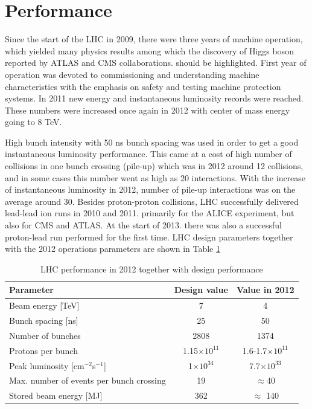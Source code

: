
\section{Performance}

Since the start of the LHC in 2009, there were three years of machine operation, which yielded many physics results among which the discovery of Higgs boson reported by ATLAS and CMS collaborations. should be highlighted. First year of operation was devoted to commissioning and understanding machine characteristics with the emphasis on safety and testing machine protection systems. In 2011 new energy and instantaneous luminosity records were reached. These numbers were increased once again in 2012 with center of mass energy going to 8 TeV.
\par High bunch intensity with 50 ns bunch spacing was used in order to get a good instantaneous luminosity performance. This came at a cost of high number of collisions in one bunch crossing (pile-up) which was in 2012 around 12 collisions, and in some cases this number went as high as 20 interactions. With the increase of instantaneous luminosity in 2012, number of pile-up interactions was on the average around 30. Besides proton-proton collisions, LHC successfully delivered lead-lead ion runs in 2010 and 2011. primarily for the ALICE experiment, but also for CMS and ATLAS. At the start of 2013. there was also a successful proton-lead run performed for the first time. LHC design parameters together with the 2012 operations parameters are shown in Table \ref{tab:LHC_design}

\begin{table}[h]
\centering
  \caption{LHC performance in 2012 together with design performance\cite{Evans:2008zzb}}
	\label{tab:LHC_design}
  \begin{tabular}{ l  c  c }
      \hline
      \hline
      Parameter & Design value & Value in 2012 \\
      \hline
      Beam energy [TeV] & 7 & 4 \\
      Bunch spacing [ns] & 25 & 50 \\
      Number of bunches & 2808 & 1374 \\
      Protons per bunch & 1.15$\times 10^{11}$ & 1.6-1.7$\times 10^{11}$ \\
      Peak luminosity [cm$^{-2}$s$^{-1}$] & 1$\times 10^{34}$ & 7.7$\times 10^{33}$ \\
      Max. number of events per bunch crossing & 19 & $\approx 40$ \\
      Stored beam energy [MJ] & 362 & $\approx$ 140 \\
      \hline
      \hline 
  \end{tabular}
\end{table}

